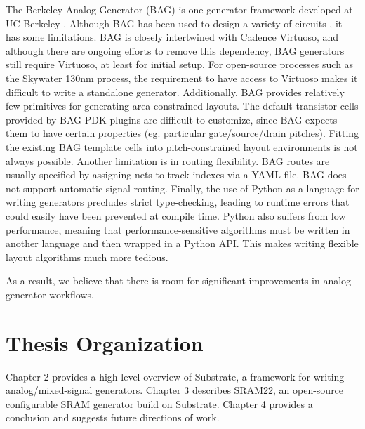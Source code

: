 The Berkeley Analog Generator (BAG) is one generator framework developed
at UC Berkeley \cite{bag}. Although BAG has been used to design a variety
of circuits \cite{serdes-gen}, it has some limitations.
BAG is closely intertwined with Cadence Virtuoso, and although there
are ongoing efforts to remove this dependency, BAG generators still require
Virtuoso, at least for initial setup. For open-source processes such as the
Skywater 130nm process, the requirement to have access to Virtuoso
makes it difficult to write a standalone generator.
Additionally, BAG provides relatively few primitives for generating
area-constrained layouts. The default transistor cells provided by BAG
PDK plugins are difficult to customize, since BAG expects them to have
certain properties (eg. particular gate/source/drain pitches). Fitting
the existing BAG template cells into pitch-constrained layout environments
is not always possible.
Another limitation is in routing flexibility. BAG routes are usually specified
by assigning nets to track indexes via a YAML file. BAG does not support
automatic signal routing.
Finally, the use of Python as a language for writing generators precludes strict type-checking,
leading to runtime errors that could easily have been prevented at compile time.
Python also suffers from low performance, meaning that performance-sensitive algorithms
must be written in another language and then wrapped in a Python API. This makes
writing flexible layout algorithms much more tedious.

As a result, we believe that there is room for significant improvements in
analog generator workflows. 

\section{Thesis Organization}

Chapter 2 provides a high-level overview of Substrate, a framework
for writing analog/mixed-signal generators.
Chapter 3 describes SRAM22, an open-source configurable SRAM generator
build on Substrate. Chapter 4 provides a conclusion and suggests
future directions of work.
